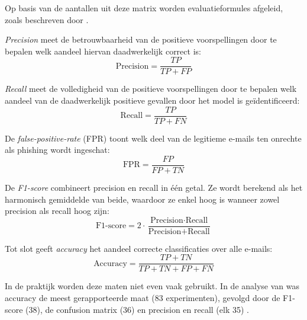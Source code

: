 Op basis van de aantallen uit deze matrix worden evaluatieformules afgeleid, zoals beschreven door \textcite{Sokolova2009}.
\bigskip

\emph{Precision} meet de betrouwbaarheid van de positieve voorspellingen door te bepalen welk aandeel hiervan daadwerkelijk correct is:
\begin{equation*}
    \text{Precision} = \frac{TP}{TP + FP}
\end{equation*}

\emph{Recall} meet de volledigheid van de positieve voorspellingen door te bepalen welk aandeel van de daadwerkelijk positieve gevallen door het model is geïdentificeerd:
\begin{equation*}
    \text{Recall} = \frac{TP}{TP + FN}
\end{equation*}

De \emph{false-positive-rate} (FPR) toont welk deel van de legitieme e-mails ten onrechte als phishing wordt ingeschat:
\begin{equation*}
    \text{FPR} = \frac{FP}{FP + TN}
\end{equation*}

De \emph{F1-score} combineert precision en recall in één getal. Ze wordt berekend als het harmonisch gemiddelde van beide, waardoor ze enkel hoog is wanneer zowel precision als recall hoog zijn:
\begin{equation*}
    \text{F1-score} = 2 \cdot \frac{\text{Precision} \cdot \text{Recall}}{\text{Precision} + \text{Recall}}
\end{equation*}

Tot slot geeft \emph{accuracy} het aandeel correcte classificaties over alle e-mails:
\begin{equation*}
    \text{Accuracy} = \frac{TP + TN}{TP + TN + FP + FN}
\end{equation*}

In de praktijk worden deze maten niet even vaak gebruikt. In de analyse van \textcite{Salloum2022} was accuracy de meest gerapporteerde maat (83 experimenten), gevolgd door de F1-score (38), de confusion matrix (36) en precision en recall (elk 35) \autocite{Salloum2022}.
